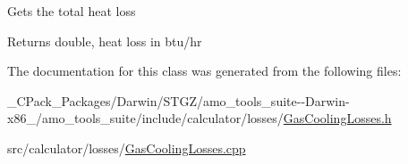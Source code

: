 Gets the total heat loss

\begin{DoxyReturn}{Returns}
double, heat loss in btu/hr 
\end{DoxyReturn}


The documentation for this class was generated from the following files\+:\begin{DoxyCompactItemize}
\item 
\+\_\+\+C\+Pack\+\_\+\+Packages/\+Darwin/\+S\+T\+G\+Z/amo\+\_\+tools\+\_\+suite-\/-\/\+Darwin-\/x86\+\_/amo\+\_\+tools\+\_\+suite/include/calculator/losses/\hyperlink{___c_pack___packages_2_darwin_2_s_t_g_z_2amo__tools__suite--_darwin-x86__64_2amo__tools__suite_2a205f1c3faea20d1b572055736aa9a09}{Gas\+Cooling\+Losses.\+h}\item 
src/calculator/losses/\hyperlink{_gas_cooling_losses_8cpp}{Gas\+Cooling\+Losses.\+cpp}\end{DoxyCompactItemize}
